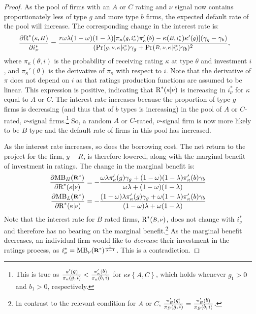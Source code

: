 \documentclass[notitlepage]{article}
\begin{document}
\begin{proof}
As the pool of firms with an $A$ or $C$ rating and $\nu$ signal now contains proportionately less of type $g$ and more type $b$ firms, the expected default rate of the pool will increase. The corresponding change in the interest rate is:
\begin{align}
\frac{\partial \textup{R}^{*}(\medmath{\kappa,H})}{\partial i^{*}_{\nu}} &= 
\frac{r\omega\lambda(1-\omega)(1-\lambda)[\pi_{\kappa}(\medmath{g,i^{*}_{\nu}})\pi_{\kappa}' (\medmath{b})-\kappa (\medmath{B,i^{*}_{\nu}})\kappa' (\medmath{g})](\gamma_{g}-\gamma_{b})}{(\textup{Pr}(\medmath{g,\nu,\kappa}|\medmath{i^{*}_{\nu}})\gamma_g + \textup{Pr}(\medmath{B,\nu,\kappa}|\medmath{i^{*}_{\nu}})\gamma_b)^2},
\end{align}
where $\pi_{\kappa}(\theta,i)$ is the probability of receiving rating $\kappa$ at type $\theta$ and investment $i$, and $\pi_{\kappa}'(\theta)$ is the derivative of $\pi_{\kappa}$ with respect to $i$. Note that the derivative of $\pi$ does not depend on $i$ as that ratings production functions are assumed to be linear. This expression is positive, indicating that $\textup{R}^{*}(\medmath{\kappa}|\medmath{\nu})$ is increasing in $i^{*}_{\nu}$ for $\kappa$ equal to $A$ or $C$. The interest rate increases because the proportion of type $g$ firms is decreasing (and thus that of $b$ types is increasing) in the pool of $A$ or $C$-rated, $\nu$-signal firms.\footnote{This is true as $\frac{\kappa'(\medmath{g})}{\pi_{\kappa}(\medmath{g,i})}<\frac{\pi_{\kappa}'(\medmath{b})}{\pi_{\kappa}(\medmath{b,i})}$ for $\kappa\epsilon\left\{A,C\right\}$, which holds whenever $g_{1}>0$ and $b_{1}>0$, respectively.} So, a random $A$ or $C$-rated, $\nu$-signal firm is now more likely to be $B$ type and the default rate of firms in this pool has increased.

As the interest rate increases, so does the borrowing cost. The net return to the project for the firm, $y-R$, is therefore lowered, along with the marginal benefit of investment in ratings. The change in the marginal benefit is:
\begin{align}
\frac{\partial \textup{MB}_{H}(\medmath{\mathbf{R^{*}}})}{\partial \textup{R}^{*}(\medmath{\kappa}|\medmath{\nu})} &= -\frac{\omega\lambda\pi_{\kappa}'(g)\gamma_{g}+(1-\omega)(1-\lambda)\pi_{\kappa}'(b)\gamma_b}{\omega\lambda + (1-\omega)(1-\lambda)}\\
\frac{\partial \textup{MB}_{L}(\medmath{\mathbf{R^{*}}})}{\partial \textup{R}^{*}(\medmath{\kappa}|\medmath{\nu})} &= -\frac{(1-\omega)\lambda\pi_{\kappa}'(g)\gamma_{g}+\omega(1-\lambda)\pi_{\kappa}'(b)\gamma_b}{(1-\omega)\lambda + \omega(1-\lambda)}
\end{align}
Note that the interest rate for $B$ rated firms, $\textup{R}^{*}(\medmath{B,\nu})$, does not change with $i^{*}_{\nu}$ and therefore has no bearing on the marginal benefit.\footnote{In contrast to the relevant condition for $A$ or $C$, $\frac{\pi_{B}'(\medmath{g})}{\pi_{B}(\medmath{g,i})}=\frac{\pi_{B}'(\medmath{b})}{\pi_{B}(\medmath{b,i})}$.} As the marginal benefit decreases, an individual firm would like to \emph{decrease} their investment in the ratings process, as $i^{*}_{\nu}=\textup{MB}_{\nu}(\medmath{\mathbf{R^{*}}})^{\frac{1}{\alpha-1}}$. This is a contradiction.
\end{proof}
\end{document}
